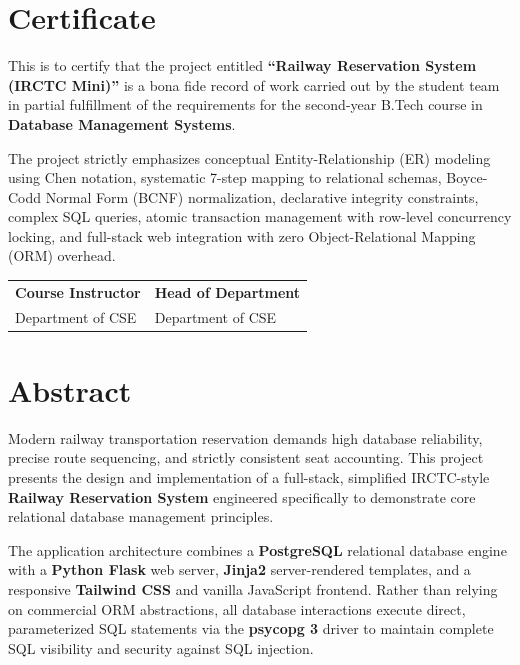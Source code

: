 \documentclass[12pt,a4paper]{report}
\begin{document}
\chapter*{Certificate}
\thispagestyle{plain}
This is to certify that the project entitled \textbf{``Railway Reservation System (IRCTC Mini)''} is a bona fide record of work carried out by the student team in partial fulfillment of the requirements for the second-year B.Tech course in \textbf{Database Management Systems}. 

The project strictly emphasizes conceptual Entity-Relationship (ER) modeling using Chen notation, systematic 7-step mapping to relational schemas, Boyce-Codd Normal Form (BCNF) normalization, declarative integrity constraints, complex SQL queries, atomic transaction management with row-level concurrency locking, and full-stack web integration with zero Object-Relational Mapping (ORM) overhead.

\vspace{2.5cm}
\noindent
\begin{tabular}{@{}p{2.5in}p{2.5in}@{}}
\textbf{Course Instructor} & \textbf{Head of Department} \\
Department of CSE & Department of CSE \\
\end{tabular}

\newpage

\chapter*{Abstract}
\thispagestyle{plain}
Modern railway transportation reservation demands high database reliability, precise route sequencing, and strictly consistent seat accounting. This project presents the design and implementation of a full-stack, simplified IRCTC-style \textbf{Railway Reservation System} engineered specifically to demonstrate core relational database management principles. 

The application architecture combines a \textbf{PostgreSQL} relational database engine with a \textbf{Python Flask} web server, \textbf{Jinja2} server-rendered templates, and a responsive \textbf{Tailwind CSS} and vanilla JavaScript frontend. Rather than relying on commercial ORM abstractions, all database interactions execute direct, parameterized SQL statements via the \textbf{psycopg 3} driver to maintain complete SQL visibility and security against SQL injection. 
\end{document}
